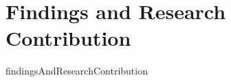 \section{Findings and Research Contribution}

findingsAndResearchContribution \cite{Dishaw1998SupportingAnalysis}